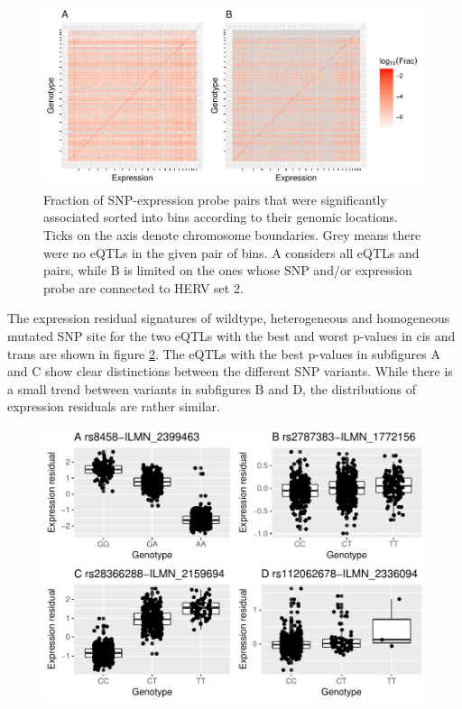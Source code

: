 \documentclass[a4paper,12pt,twoside,openright]{report}
\begin{document}
\begin{figure}[tb]
	\includegraphics[scale = 1, keepaspectratio = true]{../figures/eqtl_all_herv_heatmap}  
	\caption{Fraction of SNP-expression probe pairs that were significantly associated sorted into bins according to their genomic locations. Ticks on the axis denote chromosome boundaries. Grey means there were no eQTLs in the given pair of bins. A considers all eQTLs and pairs, while B is limited on the ones whose SNP and/or expression probe are connected to HERV set 2.}
    \label{fig:global.eqtl.heatmap}
\end{figure}

The expression residual signatures of wildtype, heterogeneous and homogeneous mutated SNP site for the two eQTLs with the best and worst p-values in cis and trans are shown in figure \ref{fig:best.worst.eqtl.boxplot}. The eQTLs with the best p-values in subfigures A and C show clear distinctions between the different SNP variants. While there is a small trend between variants in subfigures B and D, the distributions of expression residuals are rather similar.    

\begin{figure}[tb]
	\includegraphics[scale = 1, keepaspectratio = true]{../figures/best_worst_eqtl_boxplots.pdf}  
	\caption{}
    \label{fig:best.worst.eqtl.boxplot}
\end{figure}
\end{document}

